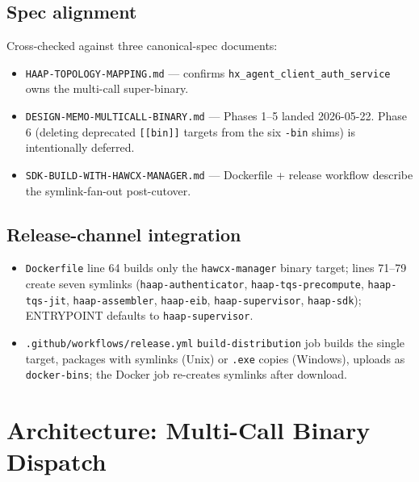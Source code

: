 \documentclass[11pt, a4paper]{article}
\newcommand{\code}[1]{\texttt{\small #1}}
\newcommand{\filepath}[1]{\textcolor{accentpurple}{\texttt{\small #1}}}
\begin{document}
\subsection{Spec alignment}

Cross-checked against three canonical-spec documents:

\begin{itemize}
  \item \filepath{HAAP-TOPOLOGY-MAPPING.md} --- confirms
        \code{hx\_agent\_client\_auth\_service} owns the multi-call super-binary.
  \item \filepath{DESIGN-MEMO-MULTICALL-BINARY.md} --- Phases 1--5 landed
        2026-05-22. Phase 6 (deleting deprecated \code{[[bin]]} targets from
        the six \code{*-bin} shims) is intentionally deferred.
  \item \filepath{SDK-BUILD-WITH-HAWCX-MANAGER.md} --- Dockerfile + release
        workflow describe the symlink-fan-out post-cutover.
\end{itemize}

\subsection{Release-channel integration}

\begin{itemize}
  \item \filepath{Dockerfile} line 64 builds only the \code{hawcx-manager}
        binary target; lines 71--79 create seven symlinks
        (\code{haap-authenticator}, \code{haap-tqs-precompute},
        \code{haap-tqs-jit}, \code{haap-assembler}, \code{haap-eib},
        \code{haap-supervisor}, \code{haap-sdk}); ENTRYPOINT defaults to
        \code{haap-supervisor}.
  \item \filepath{.github/workflows/release.yml} \code{build-distribution}
        job builds the single target, packages with symlinks (Unix) or
        \code{.exe} copies (Windows), uploads as \code{docker-bins}; the
        Docker job re-creates symlinks after download.
\end{itemize}

\clearpage

\section{Architecture: Multi-Call Binary Dispatch}\label{sec:dispatch}
\end{document}
